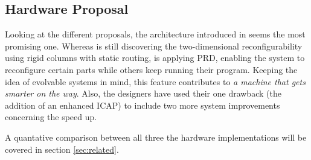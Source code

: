 
\subsection{Hardware Proposal}

Looking at the different proposals, the architecture introduced in \cite{PDR} seems the most promising one. Whereas \cite{virtex4} is still discovering the two-dimensional reconfigurability using rigid columns with static routing, \cite{PDR} is applying PRD, enabling the system to reconfigure certain parts while others keep running their program. Keeping the idea of evolvable systems in mind, this feature contributes to \emph{a machine that gets smarter on the way}. Also, the designers have used their one drawback (the addition of an enhanced ICAP) to include two more system improvements concerning the speed up. 

A quantative comparison between all three the hardware implementations will be covered in section \ref{sec:related}.
